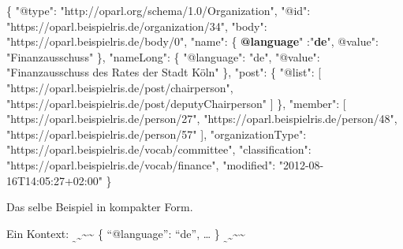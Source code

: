 \documentclass[,a4paper]{article}
\newenvironment{Shaded}{}{}
\newcommand{\DataTypeTok}[1]{\textcolor[rgb]{0.56,0.13,0.00}{{#1}}}
\newcommand{\StringTok}[1]{\textcolor[rgb]{0.25,0.44,0.63}{{#1}}}
\newcommand{\ErrorTok}[1]{\textcolor[rgb]{1.00,0.00,0.00}{\textbf{{#1}}}}
\newcommand{\NormalTok}[1]{{#1}}
\begin{document}
\begin{Shaded}
\begin{Highlighting}[]
\NormalTok{\{}
    \DataTypeTok{"@type"}\NormalTok{: }\StringTok{"http://oparl.org/schema/1.0/Organization"}\NormalTok{,}
    \DataTypeTok{"@id"}\NormalTok{: }\StringTok{"https://oparl.beispielris.de/organization/34"}\NormalTok{,}
    \DataTypeTok{"body"}\NormalTok{: }\StringTok{"https://oparl.beispielris.de/body/0"}\NormalTok{,}
    \DataTypeTok{"name"}\NormalTok{: \{}
        \ErrorTok{@language}\DataTypeTok{" :"}\ErrorTok{de}\DataTypeTok{",}
\DataTypeTok{        @value"}\NormalTok{: }\StringTok{"Finanzausschuss"}
    \NormalTok{\},}
    \DataTypeTok{"nameLong"}\NormalTok{: \{}
        \DataTypeTok{"@language"}\NormalTok{: }\StringTok{"de"}\NormalTok{,}
        \DataTypeTok{"@value"}\NormalTok{: }\StringTok{"Finanzausschuss des Rates der Stadt Köln"}
    \NormalTok{\},}
    \DataTypeTok{"post"}\NormalTok{: \{}
        \DataTypeTok{"@list"}\NormalTok{: [}
            \StringTok{"https://oparl.beispielris.de/post/chairperson"}\NormalTok{,}
            \StringTok{"https://oparl.beispielris.de/post/deputyChairperson"}
        \NormalTok{]}
    \NormalTok{\},}
    \DataTypeTok{"member"}\NormalTok{: [}
        \StringTok{"https://oparl.beispielris.de/person/27"}\NormalTok{,}
        \StringTok{"https://oparl.beispielris.de/person/48"}\NormalTok{,}
        \StringTok{"https://oparl.beispielris.de/person/57"}
    \NormalTok{],}
    \DataTypeTok{"organizationType"}\NormalTok{: }\StringTok{"https://oparl.beispielris.de/vocab/committee"}\NormalTok{,}
    \DataTypeTok{"classification"}\NormalTok{: }\StringTok{"https://oparl.beispielris.de/vocab/finance"}\NormalTok{,}
    \DataTypeTok{"modified"}\NormalTok{: }\StringTok{"2012-08-16T14:05:27+02:00"}
\NormalTok{\}}
\end{Highlighting}
\end{Shaded}

Das selbe Beispiel in kompakter Form.

Ein Kontext:
\textsubscript{\textsubscript{\textasciitilde{}}\textasciitilde{}}\textasciitilde{}\textasciitilde{}
\{ ``@language'': ``de'', \ldots{} \}
\textsubscript{\textsubscript{\textasciitilde{}}\textasciitilde{}}\textasciitilde{}\textasciitilde{}
\end{document}

